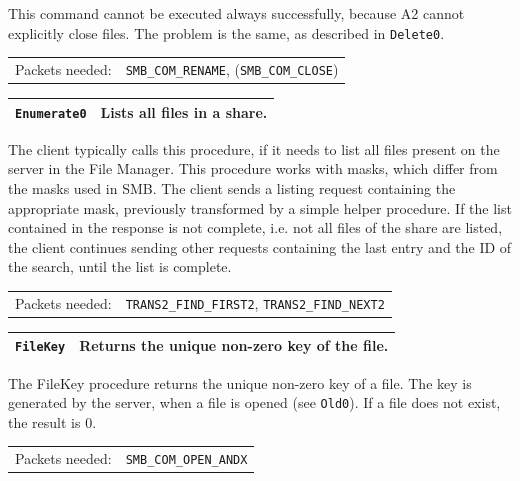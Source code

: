\documentclass[11pt,a4paper]{book}
\begin{document}
This command cannot be executed always successfully, because A2 cannot explicitly close files. The problem is the same, as described in \texttt{Delete0}. \\
\renewcommand{\tabcolsep}{5mm}
\begin{tabular}{p{3cm}p{8cm}}
Packets needed: & \texttt{SMB\_COM\_RENAME}, (\texttt{SMB\_COM\_CLOSE}) \\
\end{tabular}

\begin{center}
\renewcommand{\tabcolsep}{5mm}
\begin{tabular}{p{3cm}p{8cm}}
\texttt{Enumerate0} & \textbf{Lists all files in a share.} \\ 
\hline
\end{tabular}
\end{center}
The client typically calls this procedure, if it needs to list all files present on the server in the File Manager. This procedure works with masks, which differ from the masks used in SMB. The client sends a listing request containing the appropriate mask, previously transformed by a simple helper procedure. If the list contained in the response is not complete, i.e. not all files of the share are listed, the client continues sending other requests containing the last entry and the ID of the search, until the list is complete. \\
\renewcommand{\tabcolsep}{5mm}
\begin{tabular}{p{3cm}p{8cm}}
Packets needed: & \texttt{TRANS2\_FIND\_FIRST2}, \texttt{TRANS2\_FIND\_NEXT2} \\
\end{tabular}

\begin{center}
\renewcommand{\tabcolsep}{5mm}
\begin{tabular}{p{3cm}p{8cm}}
\texttt{FileKey} & \textbf{Returns the unique non-zero key of the file.} \\ 
\hline
\end{tabular}
\end{center}
The FileKey procedure returns the unique non-zero key of a file. The key is generated by the server, when a file is opened (see \texttt{Old0}). If a file does not exist, the result is 0. \\
\renewcommand{\tabcolsep}{5mm}
\begin{tabular}{p{3cm}p{8cm}}
Packets needed: & \texttt{SMB\_COM\_OPEN\_ANDX} \\
\end{tabular}
\end{document}
